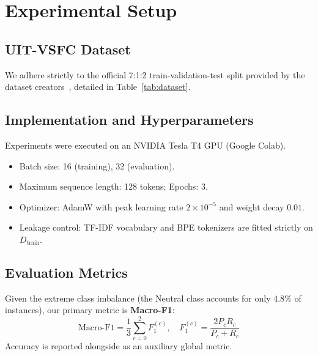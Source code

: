 \documentclass[conference]{IEEEtran}
\begin{document}
\section{Experimental Setup}
\subsection{UIT-VSFC Dataset}
We adhere strictly to the official 7:1:2 train-validation-test split provided by the dataset creators~\cite{vsfc2018}, detailed in Table~\ref{tab:dataset}.

\begin{table}[!htbp]
\caption{Dataset Partition and Distribution in UIT-VSFC}
\label{tab:dataset}
\centering
{}
\end{table}

\subsection{Implementation and Hyperparameters}
Experiments were executed on an NVIDIA Tesla T4 GPU (Google Colab).
\begin{itemize}
    \item Batch size: 16 (training), 32 (evaluation).
    \item Maximum sequence length: 128 tokens; Epochs: 3.
    \item Optimizer: AdamW with peak learning rate $2 \times 10^{-5}$ and weight decay $0.01$.
    \item Leakage control: TF-IDF vocabulary and BPE tokenizers are fitted strictly on $D_{\text{train}}$.
\end{itemize}

\subsection{Evaluation Metrics}
Given the extreme class imbalance (the Neutral class accounts for only $4.8\%$ of instances), our primary metric is \textbf{Macro-F1}:
\begin{equation}
\text{Macro-F1} = \frac{1}{3} \sum_{c=0}^2 F_1^{(c)}, \quad F_1^{(c)} = \frac{2 P_c R_c}{P_c + R_c}
\end{equation}
Accuracy is reported alongside as an auxiliary global metric.
\end{document}

